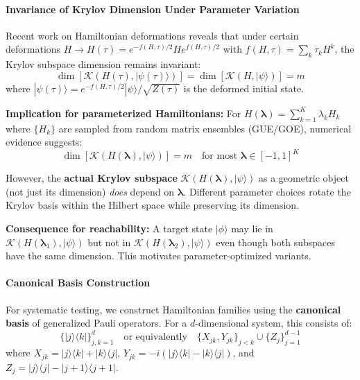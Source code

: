 \documentclass[ a4paper, 
                amsfonts, 
                amssymb, 
                amsmath, 
                reprint, 
                showkeys, 
                nofootinbib,
                superscriptaddress, 
                onecolumn, 
                notitlepage,
                aps,
                pra,
                longbibliography]{revtex4-1}
\theoremstyle{definition}
\begin{document}
\paragraph{Invariance of Krylov Dimension Under Parameter Variation}

Recent work on Hamiltonian deformations \cite{takahashi2025krylovcomplexityhamiltoniandeformations} reveals that under certain deformations $H \to H(\tau) = e^{-f(H,\tau)/2} H e^{f(H,\tau)/2}$ with $f(H,\tau) = \sum_k \tau_k H^k$, the Krylov subspace dimension remains invariant:
\begin{equation}
\dim[\mathcal{K}(H(\tau), |\psi(\tau)\rangle)] = \dim[\mathcal{K}(H, |\psi\rangle)] = m
\end{equation}
where $|\psi(\tau)\rangle = e^{-f(H,\tau)/2}|\psi\rangle/\sqrt{Z(\tau)}$ is the deformed initial state.

\textbf{Implication for parameterized Hamiltonians:} For $H(\boldsymbol{\lambda}) = \sum_{k=1}^K \lambda_k H_k$ where $\{H_k\}$ are sampled from random matrix ensembles (GUE/GOE), numerical evidence suggests:
\begin{equation}
\dim[\mathcal{K}(H(\boldsymbol{\lambda}), |\psi\rangle)] = m \quad \text{for most } \boldsymbol{\lambda} \in [-1,1]^K
\end{equation}

However, the \textbf{actual Krylov subspace} $\mathcal{K}(H(\boldsymbol{\lambda}), |\psi\rangle)$ as a geometric object (not just its dimension) \emph{does} depend on $\boldsymbol{\lambda}$. Different parameter choices rotate the Krylov basis within the Hilbert space while preserving its dimension.

\textbf{Consequence for reachability:} A target state $|\phi\rangle$ may lie in $\mathcal{K}(H(\boldsymbol{\lambda}_1), |\psi\rangle)$ but not in $\mathcal{K}(H(\boldsymbol{\lambda}_2), |\psi\rangle)$ even though both subspaces have the same dimension. This motivates parameter-optimized variants.

\paragraph{Canonical Basis Construction}

For systematic testing, we construct Hamiltonian families using the \textbf{canonical basis} of generalized Pauli operators. For a $d$-dimensional system, this consists of:
\begin{equation}
\{|j\rangle\langle k|\}_{j,k=1}^d \quad \text{or equivalently} \quad \{X_{jk}, Y_{jk}\}_{j<k} \cup \{Z_j\}_{j=1}^{d-1}
\end{equation}
where $X_{jk} = |j\rangle\langle k| + |k\rangle\langle j|$, $Y_{jk} = -i(|j\rangle\langle k| - |k\rangle\langle j|)$, and $Z_j = |j\rangle\langle j| - |j+1\rangle\langle j+1|$.
\end{document}
